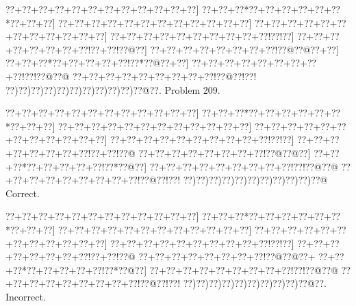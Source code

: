 \documentclass[a5paper]{article}
\begin{document}
\begin{center}
{\goo
\0??+\0??+\0??+\0??+\0??+\0??+\0??+\0??+\0??+\0??+\0??+\0??]
\0??+\0??+\0??*\0??+\0??+\0??+\0??+\0??+\0??*\0??+\0??+\0??]
\0??+\0??+\0??+\0??+\0??+\0??+\0??+\0??+\0??+\0??+\0??+\0??]
\0??+\0??+\0??+\0??+\0??+\0??+\0??+\0??+\0??+\0??+\0??+\0??]
\0??+\0??+\0??+\0??+\0??+\0??+\0??+\0??+\0??+\0??!\0??!\0??]
\0??+\0??+\0??+\0??+\0??+\0??+\0??+\0??!\0??+\0??!\0??@\0??]
\0??+\0??+\0??+\0??+\0??+\0??+\0??+\0??!\0??@\0??@\0??+\0??]
\0??+\0??+\0??*\0??+\0??+\0??+\0??+\0??!\0??*\0??@\0??+\0??]
\0??+\0??+\0??+\0??+\0??+\0??+\0??+\0??+\0??!\0??!\0??@\0??@
\0??+\0??+\0??+\0??+\0??+\0??+\0??+\0??+\0??!\0??@\0??!\0??!
\0??)\0??)\0??)\0??)\0??)\0??)\0??)\0??)\0??)\0??)\0??@\0??.
}
Problem 209.

\end{center}
\begin{center}
{\goo
\0??+\0??+\0??+\0??+\0??+\0??+\0??+\0??+\0??+\0??+\0??+\0??]
\0??+\0??+\0??*\0??+\0??+\0??+\0??+\0??+\0??*\0??+\0??+\0??]
\0??+\0??+\0??+\0??+\0??+\0??+\0??+\0??+\0??+\0??+\0??+\0??]
\0??+\0??+\0??+\0??+\0??+\0??+\0??+\0??+\0??+\0??+\0??+\0??]
\0??+\0??+\0??+\0??+\0??+\0??+\0??+\0??+\0??+\0??!\0??!\0??]
\0??+\0??+\0??+\0??+\0??+\0??+\0??+\0??!\0??+\0??!\0??@
\0??+\0??+\0??+\0??+\0??+\0??+\0??+\0??!\0??@\0??@\0??]
\0??+\0??+\0??*\0??+\0??+\0??+\0??+\0??!\0??*\0??@\0??]
\0??+\0??+\0??+\0??+\0??+\0??+\0??+\0??+\0??!\0??!\0??@\0??@
\0??+\0??+\0??+\0??+\0??+\0??+\0??+\0??+\0??!\0??@\0??!\0??!
\0??)\0??)\0??)\0??)\0??)\0??)\0??)\0??)\0??)\0??)\0??@
}
Correct. 

\end{center}
\begin{center}
{\goo
\0??+\0??+\0??+\0??+\0??+\0??+\0??+\0??+\0??+\0??+\0??+\0??]
\0??+\0??+\0??*\0??+\0??+\0??+\0??+\0??+\0??*\0??+\0??+\0??]
\0??+\0??+\0??+\0??+\0??+\0??+\0??+\0??+\0??+\0??+\0??+\0??]
\0??+\0??+\0??+\0??+\0??+\0??+\0??+\0??+\0??+\0??+\0??+\0??]
\0??+\0??+\0??+\0??+\0??+\0??+\0??+\0??+\0??+\0??!\0??!\0??]
\0??+\0??+\0??+\0??+\0??+\0??+\0??+\0??!\0??+\0??!\0??@
\0??+\0??+\0??+\0??+\0??+\0??+\0??+\0??!\0??@\0??@\0??+
\0??+\0??+\0??*\0??+\0??+\0??+\0??+\0??!\0??*\0??@\0??]
\0??+\0??+\0??+\0??+\0??+\0??+\0??+\0??+\0??!\0??!\0??@\0??@
\0??+\0??+\0??+\0??+\0??+\0??+\0??+\0??+\0??!\0??@\0??!\0??!
\0??)\0??)\0??)\0??)\0??)\0??)\0??)\0??)\0??)\0??@\0??.
}
Incorrect. 

\end{center}
\newpage
\end{document}
